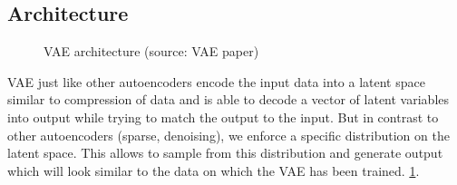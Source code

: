 





\subsection{Architecture}
\label{sub:vae_architecture}

\begin{figure}[htb]
\centering
\resizebox{5cm}{!}{}
  \caption{VAE architecture (source: VAE paper)}\label{fig:vae_architecture}
\end{figure}
VAE just like other autoencoders encode the input data into a latent space similar to compression of data and is able to decode a vector of latent variables into output while trying to match the output to the input.
But in contrast to other autoencoders (sparse, denoising), we enforce a specific distribution on the latent space.
This allows to sample from this distribution and generate output which will look similar to the data on which the VAE has been trained.
\ref{fig:vae_architecture}.


